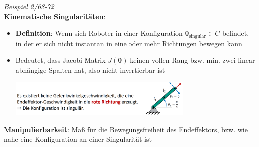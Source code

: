 \textit{Beispiel 2/68-72}\\

\textbf{Kinematische Singularitäten}:
\begin{itemize}
	\item \textbf{Definition}: Wenn sich Roboter in einer Konfiguration $\boldsymbol{\theta}_\text{singular}\in C$ befindet, in der er sich nicht instantan in eine oder mehr Richtungen bewegen kann
	\item Bedeutet, dass Jacobi-Matrix $J(\boldsymbol{\theta})$ keinen vollen Rang bzw. min. zwei linear abhängige Spalten hat, also nicht invertierbar ist
	\begin{center}
		\includegraphics[width=0.7\textwidth]{images/singular.png}
	\end{center}
\end{itemize}
\bigskip
\textbf{Manipulierbarkeit}: Maß für die Bewegungsfreiheit des Endeffektors, bzw. wie nahe eine Konfiguration an einer Singularität ist
